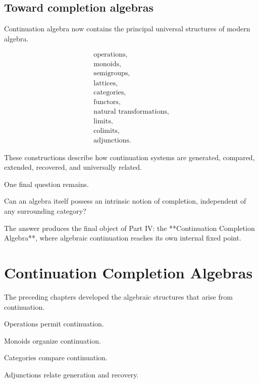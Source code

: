 \documentclass[13pt,openany]{book}
\theoremstyle{plain}
\theoremstyle{definition}
\begin{document}
\section{Toward completion algebras}

Continuation algebra now contains the principal universal structures of modern
algebra.

\[
\begin{array}{c}
\text{operations},\\
\text{monoids},\\
\text{semigroups},\\
\text{lattices},\\
\text{categories},\\
\text{functors},\\
\text{natural transformations},\\
\text{limits},\\
\text{colimits},\\
\text{adjunctions}.
\end{array}
\]

These constructions describe how continuation systems are generated, compared,
extended, recovered, and universally related.

One final question remains.

Can an algebra itself possess an intrinsic notion of completion, independent
of any surrounding category?

The answer produces the final object of Part IV: the **Continuation Completion
Algebra**, where algebraic continuation reaches its own internal fixed point.

\chapter{Continuation Completion Algebras}

The preceding chapters developed the algebraic structures that arise from
continuation.

Operations permit continuation.

Monoids organize continuation.

Categories compare continuation.

Adjunctions relate generation and recovery.
\end{document}
